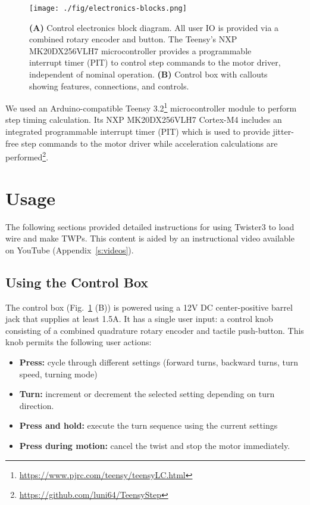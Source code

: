 \documentclass[11pt,a4paper]{article}
\begin{document}
\begin{figure}
\centering
\texttt{[image: ./fig/electronics-blocks.png]}
\caption{\textbf{(A)} Control electronics block diagram. All user IO is
    provided via a combined rotary encoder and button. The Teensy's NXP
    MK20DX256VLH7 microcontroller provides a  programmable interrupt timer
    (PIT) to control step commands to the motor driver, independent of nominal
    operation.
    \textbf{(B)} Control box with callouts showing features, connections, and
    controls.}
\label{f:ctrl_box}
\end{figure}

We used an Arduino-compatible Teensy
3.2\footnote{\url{https://www.pjrc.com/teensy/teensyLC.html}} microcontroller
module to perform step timing calculation. Its NXP MK20DX256VLH7 Cortex-M4
includes an integrated programmable interrupt timer (PIT) which is used to
provide jitter-free step commands to the motor driver while acceleration
calculations are
performed\footnote{\url{https://github.com/luni64/TeensyStep}}.

\section{Usage}
The following sections provided detailed instructions for using Twister3 to
load wire and make TWPs. This content is aided by an instructional video
available on YouTube (Appendix~\ref{s:videos}).

\subsection{Using the Control Box}
The control box (Fig.~\ref{f:ctrl_box} (B)) is powered using a 12V DC
center-positive barrel jack that supplies at least 1.5A. It has a single user
input: a control knob consisting of a combined quadrature rotary encoder and
tactile push-button. This knob permits the following user actions:

\begin{itemize}[noitemsep]
    \item \textbf{Press:} cycle through different settings (forward turns,
        backward turns, turn speed, turning mode)
    \item \textbf{Turn:} increment or decrement the selected setting
        depending on turn direction.
    \item \textbf{Press and hold:} execute the turn sequence using the
        current settings
    \item \textbf{Press during motion:} cancel the twist and stop the motor
        immediately.
\end{itemize}
\end{document}
